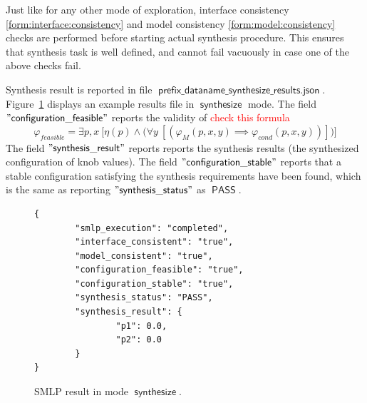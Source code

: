 \documentclass[a4paper,parskip=half]{article} %
\newcommand*\eqdef=
\newcommand*\suffix[1]{\operatorname{\mathsf{#1}}} %
\newcommand*\mode[1]{\operatorname{\mathsf{#1}}} %
\newcommand*\speckey[1]{\operatorname{\mathsf{"{#1}"}}} %
\newcommand*\specval[1]{\operatorname{\mathsf{{#1}}}} %
\newcommand\todozk[1]{\textcolor{red}{#1}}
\newcommand*\ZK{\todozk}
\begin{document}
Just like for any other mode of exploration, interface consistency \cref{form:interface:consistency} and
model consistency \cref{form:model:consistency} checks are performed before starting actual synthesis procedure.
This ensures that synthesis task is well defined, and cannot fail vacuously in case one of the above checks fail.

Synthesis result is reported in file $\suffix{prefix\_dataname\_synthesize\_results.json}$.
Figure~\ref{fig:synthesize:result} displays an example results file in $\mode{synthesize}$ mode.
The field $\speckey{configuration\_feasible}$ reports the validity of \ZK{check this formula}
\begin{equation}\label{form:gear:query:candidate}
\varphi_{\mathit{feasible}} \eqdef  \exists p,x~ \big[ \eta(p) \wedge \big(
    \forall y~[
   (\varphi_M(p,x,y)  \implies  \varphi_{\mathit{cond}}(p,x,y))
    ]\big)\big]
\end{equation}
The field  $\speckey{synthesis\_result}$ reports reports the synthesis results (the synthesized configuration of knob values).
The field  $\speckey{configuration\_stable}$ reports that a stable configuration satisfying the synthesis requirements
have been found, which is the same as reporting $\speckey{synthesis\_status}$ as  $\specval{PASS}$.

\begin{figure}[tp]%
\small
\begin{verbatim}
{
        "smlp_execution": "completed",
        "interface_consistent": "true",
        "model_consistent": "true",
        "configuration_feasible": "true",
        "configuration_stable": "true",
        "synthesis_status": "PASS",
        "synthesis_result": {
                "p1": 0.0,
                "p2": 0.0
        }
}
\end{verbatim}
\caption{SMLP result in mode $\mode{synthesize}$.}
\label{fig:synthesize:result}
\end{figure}
\end{document}

